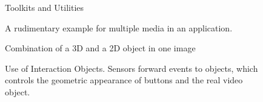\batchmode
{}
\makeatletter


\newcommand{\made}{{\sc MADE}}
\newcommand{\premo}{{\sc PREMO}}
\newcommand{\esprit}{ESPRIT}

\newcommand{\kedit}{{\small KEDIT}}
\newcommand{\unix}{{\small UNIX}}
\newcommand{\msdos}{{\small MS--DOS}}
\newcommand{\mswin}{{\small MS--WINDOWS}}
\newcommand{\nt}{{Windows--NT}}



\makeatother
\newenvironment{tex2html_wrap}{}{}
\setlength{\textheight}{10in}
\pagestyle{empty}
\newpage

{\samepage \clearpage \begin{figure}%
[tbp]
  \leavevmode\centering
  \epsfysize=5in
  \caption{Toolkits and Utilities}
  \label{fig:over}
\end{figure}
}


\newpage

{\samepage \clearpage \begin{figure}%
[tbp]
  \leavevmode\centering
  \caption{A rudimentary example for multiple media in an application.}
  \label{fig:window}
\end{figure}
}


\newpage

{\samepage \clearpage \begin{figure}%
[tbp]
  \leavevmode\centering
  \caption{Combination of a 3D and a 2D object in one image}
  \label{fig:image}
\end{figure}
}


\newpage

{\samepage \clearpage \begin{figure}%
[tbp]
  \leavevmode\centering
  \caption{Use of Interaction Objects. Sensors forward events to
  objects, which controls the geometric appearance of buttons and the
  real video object.}
  \label{fig:interact}
\end{figure}
}


\newpage

